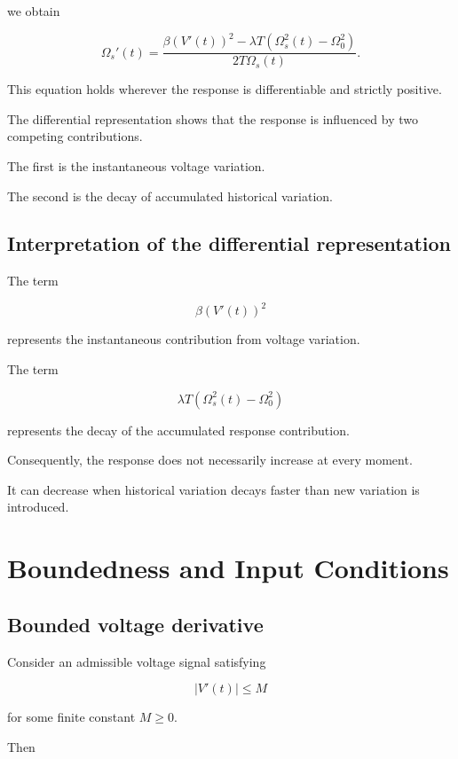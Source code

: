 \documentclass[12pt]{article}
\theoremstyle{definition}
\theoremstyle{remark}
\begin{document}
we obtain

\begin{equation}
\Omega_s'(t)=
\frac{
\beta(V'(t))^2
-
\lambda T\left(\Omega_s^2(t)-\Omega_0^2\right)
}{
2T\Omega_s(t)
}.
\label{eq:response-ode}
\end{equation}

This equation holds wherever the response
is differentiable and strictly positive.

The differential representation shows that
the response is influenced by two competing
contributions.

The first is the instantaneous voltage
variation.

The second is the decay of accumulated
historical variation.

\subsection{Interpretation of the differential representation}

The term

\[
\beta(V'(t))^2
\]

represents the instantaneous contribution
from voltage variation.

The term

\[
\lambda T
\left(\Omega_s^2(t)-\Omega_0^2\right)
\]

represents the decay of the accumulated
response contribution.

Consequently, the response does not necessarily
increase at every moment.

It can decrease when historical variation
decays faster than new variation is introduced.

\section{Boundedness and Input Conditions}

\subsection{Bounded voltage derivative}

Consider an admissible voltage signal satisfying

\begin{equation}
|V'(t)|\leq M
\end{equation}

for some finite constant \(M\geq0\).

Then
\end{document}
